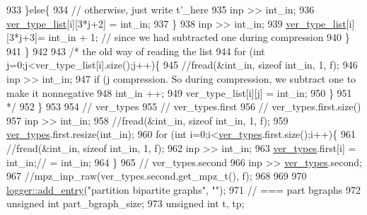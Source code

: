 \begin{DoxyCode}
933         \}\textcolor{keywordflow}{else}\{
934           \textcolor{comment}{// otherwise, just write t'\_here}
935           inp >> int\_in;
936           \hyperlink{classmarked__graph__compressed_af2e3e55223d436628a02758dfae88493}{ver\_type\_list}[i][3*j+2] = int\_in;
937         \}
938         inp >> int\_in;
939         \hyperlink{classmarked__graph__compressed_af2e3e55223d436628a02758dfae88493}{ver\_type\_list}[i][3*j+3]= int\_in + 1; \textcolor{comment}{// since we had subtracted one during compression}
940       \}
941     \}
942 
943     \textcolor{comment}{/* the old way of reading the list}
944 \textcolor{comment}{    for (int j=0;j<ver\_type\_list[i].size();j++)\{}
945 \textcolor{comment}{      //fread(&int\_in, sizeof int\_in, 1, f);}
946 \textcolor{comment}{      inp >> int\_in;}
947 \textcolor{comment}{      if (j%
       compression. So during compression, we subtract one to make it nonnegative}
948 \textcolor{comment}{        int\_in ++;}
949 \textcolor{comment}{      ver\_type\_list[i][j] = int\_in;}
950 \textcolor{comment}{    \}}
951 \textcolor{comment}{    */}
952   \}
953 
954   \textcolor{comment}{// ver\_types}
955   \textcolor{comment}{// ver\_types.first}
956   \textcolor{comment}{// ver\_types.first.size()}
957   inp >> int\_in;
958   \textcolor{comment}{//fread(&int\_in, sizeof int\_in, 1, f);}
959   \hyperlink{classmarked__graph__compressed_af446cc5e23c241a92b76642fd5ebc403}{ver\_types}.first.resize(int\_in);
960   \textcolor{keywordflow}{for} (\textcolor{keywordtype}{int} i=0;i<\hyperlink{classmarked__graph__compressed_af446cc5e23c241a92b76642fd5ebc403}{ver\_types}.first.size();i++)\{
961     \textcolor{comment}{//fread(&int\_in, sizeof int\_in, 1, f);}
962     inp >> int\_in;
963     \hyperlink{classmarked__graph__compressed_af446cc5e23c241a92b76642fd5ebc403}{ver\_types}.first[i] = int\_in;\textcolor{comment}{// = int\_in;}
964   \}
965   \textcolor{comment}{// ver\_types.second}
966   inp >> \hyperlink{classmarked__graph__compressed_af446cc5e23c241a92b76642fd5ebc403}{ver\_types}.second;
967   \textcolor{comment}{//mpz\_inp\_raw(ver\_types.second.get\_mpz\_t(), f);}
968 
969 
970   \hyperlink{classlogger_a710163deb17bc81f70d53d285b8ac9ac}{logger::add\_entry}(\textcolor{stringliteral}{"partition bipartite graphs"}, \textcolor{stringliteral}{""});
971   \textcolor{comment}{// === part bgraphs}
972   \textcolor{keywordtype}{unsigned} \textcolor{keywordtype}{int} part\_bgraph\_size;
973   \textcolor{keywordtype}{unsigned} \textcolor{keywordtype}{int} t, tp;

\end{DoxyCode}
